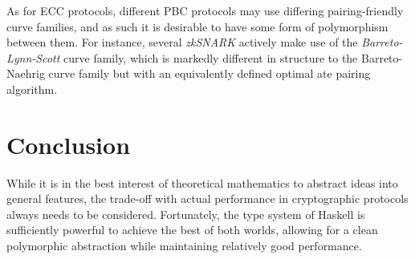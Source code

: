 \documentclass{article}
\theoremstyle{definition}
\begin{document}
As for ECC protocols, different PBC protocols may use differing pairing-friendly curve families, and as such it is desirable to have some form of polymorphism between them. For instance, several \emph{zkSNARK} actively make use of the \emph{Barreto-Lynn-Scott} curve family, which is markedly different in structure to the Barreto-Naehrig curve family but with an equivalently defined optimal ate pairing algorithm.

\section{Conclusion}

While it is in the best interest of theoretical mathematics to abstract ideas into general features, the trade-off with actual performance in cryptographic protocols always needs to be considered. Fortunately, the type system of Haskell is sufficiently powerful to achieve the best of both worlds, allowing for a clean polymorphic abstraction while maintaining relatively good performance.
\end{document}
